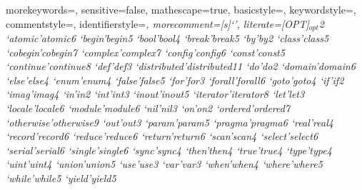   {
    morekeywords={},
    sensitive=false,
    mathescape=true,
    basicstyle=\footnotesize,
    keywordstyle=\footnotesize,
    commentstyle=\footnotesize\ttfamily,
    identifierstyle=\footnotesize\itshape,
    morecomment=[s]{`}{'},
    literate={[OPT]}{{{\scriptsize $_{opt}$}}}{2}
             {`atomic'}{{\ttfamily atomic}}{6}
             {`begin'}{{\ttfamily begin}}{5}
             {`bool'}{{\ttfamily bool}}{4}
             {`break'}{{\ttfamily break}}{5}
             {`by'}{{\ttfamily by}}{2}
             {`class'}{{\ttfamily class}}{5}
             {`cobegin'}{{\ttfamily cobegin}}{7}
             {`complex'}{{\ttfamily complex}}{7}
             {`config'}{{\ttfamily config}}{6}
             {`const'}{{\ttfamily const}}{5}
             {`continue'}{{\ttfamily continue}}{8}
             {`def'}{{\ttfamily def}}{3}
             {`distributed'}{{\ttfamily distributed}}{11}
             {`do'}{{\ttfamily do}}{2}
             {`domain'}{{\ttfamily domain}}{6}
             {`else'}{{\ttfamily else}}{4}
             {`enum'}{{\ttfamily enum}}{4}
             {`false'}{{\ttfamily false}}{5}
             {`for'}{{\ttfamily for}}{3}
             {`forall'}{{\ttfamily forall}}{6}
             {`goto'}{{\ttfamily goto}}{4}
             {`if'}{{\ttfamily if}}{2}
             {`imag'}{{\ttfamily imag}}{4}
             {`in'}{{\ttfamily in}}{2}
             {`int'}{{\ttfamily int}}{3}
             {`inout'}{{\ttfamily inout}}{5}
             {`iterator'}{{\ttfamily iterator}}{8}
             {`let'}{{\ttfamily let}}{3}
             {`locale'}{{\ttfamily locale}}{6}
             {`module'}{{\ttfamily module}}{6}
             {`nil'}{{\ttfamily nil}}{3}
             {`on'}{{\ttfamily on}}{2}
             {`ordered'}{{\ttfamily ordered}}{7}
             {`otherwise'}{{\ttfamily otherwise}}{9}
             {`out'}{{\ttfamily out}}{3}
             {`param'}{{\ttfamily param}}{5}
             {`pragma'}{{\ttfamily pragma}}{6}
             {`real'}{{\ttfamily real}}{4}
             {`record'}{{\ttfamily record}}{6}
             {`reduce'}{{\ttfamily reduce}}{6}
             {`return'}{{\ttfamily return}}{6}
             {`scan'}{{\ttfamily scan}}{4}
             {`select'}{{\ttfamily select}}{6}
             {`serial'}{{\ttfamily serial}}{6}
             {`single'}{{\ttfamily single}}{6}
             {`sync'}{{\ttfamily sync}}{4}
             {`then'}{{\ttfamily then}}{4}
             {`true'}{{\ttfamily true}}{4}
             {`type'}{{\ttfamily type}}{4}
             {`uint'}{{\ttfamily uint}}{4}
             {`union'}{{\ttfamily union}}{5}
             {`use'}{{\ttfamily use}}{3}
             {`var'}{{\ttfamily var}}{3}
             {`when'}{{\ttfamily when}}{4}
             {`where'}{{\ttfamily where}}{5}
             {`while'}{{\ttfamily while}}{5}
             {`yield'}{{\ttfamily yield}}{5}
  }


\newcommand{\sntx}[1]{\lstinline[language=syntax]!#1!}
